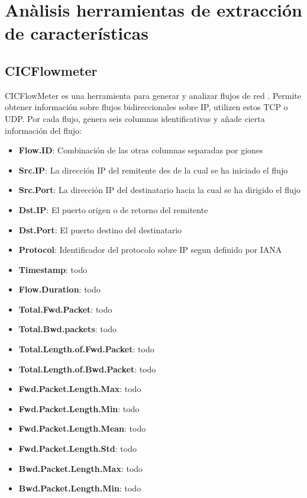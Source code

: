 \section{Anàlisis herramientas de extracción de características}

\subsection{CICFlowmeter}

CICFlowMeter es una herramienta para generar y analizar flujos de red \cite{cicflowpost}. Permite obtener información sobre flujos bidireccionales sobre IP, utilizen estos TCP o UDP. Por cada flujo, genera seis columnas identificativas y añade cierta información del flujo:

\begin{itemize}
    \item \textbf{Flow.ID}: Combinación de las otras columnas separadas por giones
    \item \textbf{Src.IP}: La dirección IP del remitente des de la cual se ha iniciado el flujo
    \item \textbf{Src.Port}: La dirección IP del destinatario hacia la cual se ha dirigido el flujo
    \item \textbf{Dst.IP}: El puerto origen o de retorno del remitente
    \item \textbf{Dst.Port}: El puerto destino del destinatario
    \item \textbf{Protocol}: Identificador del protocolo sobre IP segun definido por IANA \cite{ipprotocolnumbers}
    \item \textbf{Timestamp}: todo
    \item \textbf{Flow.Duration}: todo
    \item \textbf{Total.Fwd.Packet}: todo
    \item \textbf{Total.Bwd.packets}: todo
    \item \textbf{Total.Length.of.Fwd.Packet}: todo
    \item \textbf{Total.Length.of.Bwd.Packet}: todo
    \item \textbf{Fwd.Packet.Length.Max}: todo
    \item \textbf{Fwd.Packet.Length.Min}: todo
    \item \textbf{Fwd.Packet.Length.Mean}: todo
    \item \textbf{Fwd.Packet.Length.Std}: todo
    \item \textbf{Bwd.Packet.Length.Max}: todo
    \item \textbf{Bwd.Packet.Length.Min}: todo

\end{itemize}
